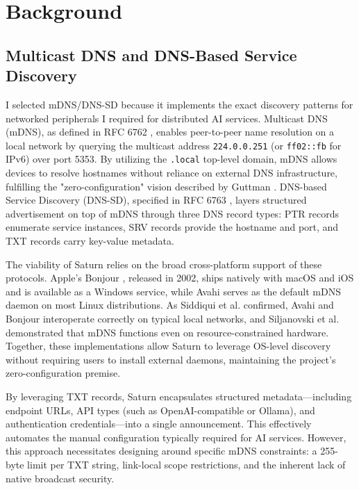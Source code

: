 \chapter{Background}
\label{ch:background}

\section{Multicast DNS and DNS-Based Service Discovery}
\label{sec:mdns-dnssd}

I selected mDNS/DNS-SD because it implements the exact discovery patterns for networked peripherals I required for distributed AI services. Multicast DNS (mDNS), as defined in RFC 6762 \cite{rfc6762}, enables peer-to-peer name resolution on a local network by querying the multicast address \texttt{224.0.0.251} (or \texttt{ff02::fb} for IPv6) over port 5353. By utilizing the \texttt{.local} top-level domain, mDNS allows devices to resolve hostnames without reliance on external DNS infrastructure, fulfilling the "zero-configuration" vision described by Guttman \cite{guttman2001zeroconf}. DNS-based Service Discovery (DNS-SD), specified in RFC 6763 \cite{rfc6763}, layers structured advertisement on top of mDNS through three DNS record types: PTR records enumerate service instances, SRV records provide the hostname and port, and TXT records carry key-value metadata. 

The viability of Saturn relies on the broad cross-platform support of these protocols. Apple's Bonjour \cite{bonjour}, released in 2002, ships natively with macOS and iOS and is available as a Windows service, while Avahi \cite{avahi} serves as the default mDNS daemon on most Linux distributions. As Siddiqui et al. \cite{siddiqui2012zeroconf} confirmed, Avahi and Bonjour interoperate correctly on typical local networks, and Siljanovski et al. \cite{siljanovski2014mdns} demonstrated that mDNS functions even on resource-constrained hardware. Together, these implementations allow Saturn to leverage OS-level discovery without requiring users to install external daemons, maintaining the project's zero-configuration premise.

By leveraging TXT records, Saturn encapsulates structured metadata—including endpoint URLs, API types (such as OpenAI-compatible or Ollama), and authentication credentials—into a single announcement. This effectively automates the manual configuration typically required for AI services. However, this approach necessitates designing around specific mDNS constraints: a 255-byte limit per TXT string, link-local scope restrictions, and the inherent lack of native broadcast security. 

